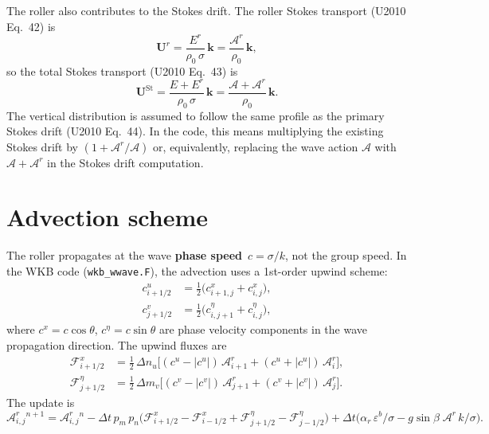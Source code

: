 \documentclass[11pt]{article}
\begin{document}
The roller also contributes to the Stokes drift. The roller Stokes
transport (U2010 Eq.~42) is
\begin{equation}
  \mathbf{U}^r = \frac{E^r}{\rho_0\,\sigma}\,\mathbf{k}
               = \frac{\mathscr{A}^r}{\rho_0}\,\mathbf{k},
  \label{eq:roller_stokes}
\end{equation}
so the total Stokes transport (U2010 Eq.~43) is
\begin{equation}
  \mathbf{U}^{\mathrm{St}} = \frac{E + E^r}{\rho_0\,\sigma}\,\mathbf{k}
  = \frac{\mathscr{A} + \mathscr{A}^r}{\rho_0}\,\mathbf{k}.
\end{equation}
The vertical distribution is assumed to follow the same profile as the
primary Stokes drift (U2010 Eq.~44). In the code, this means multiplying the
existing Stokes drift by $(1 + \mathscr{A}^r/\mathscr{A})$ or, equivalently,
replacing the wave action $\mathscr{A}$ with
$\mathscr{A} + \mathscr{A}^r$ in the Stokes drift computation.

\section{Advection scheme}

The roller propagates at the wave \textbf{phase speed}~$c = \sigma/k$,
not the group speed. In the WKB code (\texttt{wkb\_wwave.F}), the advection
uses a 1st-order upwind scheme:
\begin{align}
  c^u_{i+1/2} &= \tfrac{1}{2}\bigl(c^x_{i+1,j} + c^x_{i,j}\bigr), \\
  c^v_{j+1/2} &= \tfrac{1}{2}\bigl(c^\eta_{i,j+1} + c^\eta_{i,j}\bigr),
\end{align}
where $c^x = c\cos\theta$, $c^\eta = c\sin\theta$ are phase velocity
components in the wave propagation direction. The upwind fluxes are
\begin{align}
  \mathcal{F}^x_{i+1/2} &= \tfrac{1}{2}\,\Delta n_u\bigl[
    (c^u - |c^u|)\,\mathscr{A}^r_{i+1} + (c^u + |c^u|)\,\mathscr{A}^r_{i}
  \bigr], \\
  \mathcal{F}^\eta_{j+1/2} &= \tfrac{1}{2}\,\Delta m_v\bigl[
    (c^v - |c^v|)\,\mathscr{A}^r_{j+1} + (c^v + |c^v|)\,\mathscr{A}^r_{j}
  \bigr].
\end{align}
The update is
\begin{equation}
  \mathscr{A}^r_{i,j}^{n+1} = \mathscr{A}^r_{i,j}^{n}
  - \Delta t\,p_m\,p_n\bigl(
    \mathcal{F}^x_{i+1/2} - \mathcal{F}^x_{i-1/2}
    + \mathcal{F}^\eta_{j+1/2} - \mathcal{F}^\eta_{j-1/2}
  \bigr)
  + \Delta t\bigl(\alpha_r\,\varepsilon^b/\sigma
                 - g\sin\beta\;\mathscr{A}^r\,k/\sigma\bigr).
  \label{eq:upwind_update}
\end{equation}
\end{document}
